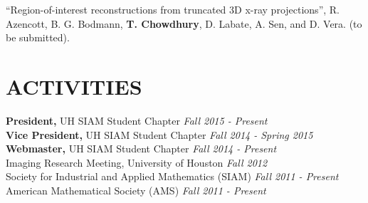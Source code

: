 \documentclass[margin,line,10pt]{res} %
\begin{document}
\begin{resume}
``Region-of-interest reconstructions from truncated 3D x-ray projections'', R. Azencott, B. G. Bodmann, \textbf{T. Chowdhury}, D. Labate, A. Sen, and D. Vera. (to be submitted).


\section{ACTIVITIES} 
{\bf President,} UH SIAM Student Chapter \hfill {\em Fall 2015 - Present} \\
{\bf Vice President,} UH SIAM Student Chapter \hfill {\em Fall 2014 - Spring 2015} \\
{\bf Webmaster,} UH SIAM Student Chapter \hfill {\em Fall 2014 - Present} \\
Imaging Research Meeting, University of Houston \hfill {\em Fall 2012} \\
Society for Industrial and Applied Mathematics (SIAM) \hfill {\em Fall 2011 - Present} \\
American Mathematical Society (AMS) \hfill {\em Fall 2011 - Present}


\end{resume}
\end{document}
